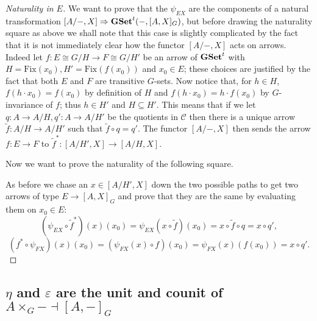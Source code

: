 \documentclass[italian, 12pt, reqno]{article}
\theoremstyle{myteo}
\numberwithin{equation}{section}
\newcommand{\cat}[1]{\mathscr{#1}}
\newcommand{\gset}{\text{\textbf{GSet}}}
\newcommand{\tgset}{\text{\textbf{GSet}}^t}
\newcommand{\fix}[1]{\text{Fix}(#1)}
\newcommand{\homs}[2]{[#1, #2]}
\newcommand{\fun}[3]{#1\colon#2\to #3}
\begin{document}
\begin{proof}[Naturality in \(E\)]
  \label{proof:naturality_in_E}
  We want to prove that the \(\psi_{EX}\) are the components of a natural transformation \(\homs{A/-}{X}\Rightarrow\tgset(-, \homs{A}{X}_G)\), but before drawing the naturality square as above we shall note that this case is slightly complicated by the fact that it is not immediately clear how the functor \(\homs{A/-}{X}\) acts on arrows.
  Indeed let \(\fun{f}{E\cong G/H}{F\cong G/H'}\) be an arrow of \(\tgset\) with \(H = \fix{x_0}, H' = \fix{f(x_0)}\) and \(x_0\in E\); these choices are justified by the fact that both \(E\) and \(F\) are transitive \(G\)-sets.
  Now notice that, for \(h\in H\), \(f(h\cdot x_0) = f(x_0)\) by definition of \(H\) and \(f(h\cdot x_0) = h\cdot f(x_0)\) by \(G\)-invariance of \(f\); thus \(h\in H'\) and \(H\subseteq H'\).
  This means that if we let \(\fun{q}{A}{A/H}, \fun{q'}{A}{A/H'}\) be the quotients in \(\cat{C}\) then there is a unique arrow \(\fun{\widetilde{f}}{A/H}{A/H'}\) such that \(\widetilde{f}\circ q = q'\).
  The functor \(\homs{A/-}{X}\) then sends the arrow \(\fun{f}{E}{F}\) to \(\fun{\widetilde{f}^*}{\homs{A/H'}{X}}{\homs{A/H}{X}}\).

  Now we want to prove the naturality of the following square.
  \begin{center}
  \end{center}
  As before we chase an \(x\in\homs{A/H'}{X}\) down the two possible paths to get two arrows of type \(E\to\homs{A}{X}_G\) and prove that they are the same by evaluating them on \(x_0\in E\):
  \[(\psi_{EX}\circ \widetilde{f}^*)(x)(x_0) = \psi_{EX}(x\circ \widetilde{f})(x_0) = x\circ \widetilde{f}\circ q = x\circ q',\]
  \[(f^*\circ \psi_{FX})(x)(x_0) = (\psi_{FX}(x)\circ f)(x_0) = \psi_{FX}(x)(f(x_0)) = x\circ q'.\]
\end{proof}

\subsection{\(\eta\) and \(\varepsilon\) are the unit and counit of \(A\times_G- \dashv \homs{A}{-}_G\)}
\end{document}
